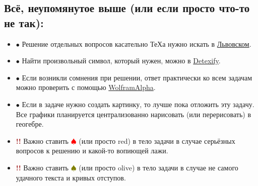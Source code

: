 \documentclass[12pt]{article}
\newenvironment{mylist} %
{ \begin{itemize}
    \setlength{\itemsep}{0pt}
    \setlength{\parskip}{0pt}
    \setlength{\parsep}{0pt}     }
{ \end{itemize}                  }
\begin{document}
\subsection*{\textcolor{Emerald}{\textbf{Всё, неупомянутое выше (или если просто что-то не так):}}}
\begin{mylist}
\item [$\bullet$] Решение отдельных вопросов касательно ТеХа нужно искать в \href{https://www.mccme.ru/free-books/llang/newllang.pdf}{Львовском}.

\item [$\bullet$] Найти произвольный символ, который нужен, можно в \href{http://detexify.kirelabs.org/classify.html}{Detexify}.

\item [$\bullet$] Если возникли сомнения при решении, ответ практически ко всем задачам можно проверить с помощью \href{https://www.wolframalpha.com/}{WolframAlpha}.

\item [$\bullet$] Если в задаче нужно создать картинку, то лучше пока отложить эту задачу. Все графики планируется централизованно нарисовать (или перерисовать) в геогебре.

\item [\textcolor{brown}{\textbf{!!}}] Важно ставить \textcolor{red}{\textbf{$\spadesuit$}}
(или просто red) в тело задачи в случае серьёзных вопросов к решению и какой-то вопиющей лажи.

\item [\textcolor{brown}{\textbf{!!}}] Важно ставить \textcolor{olive}{\textbf{$\spadesuit$}}
(или просто olive) в тело задачи в случае не самого удачного текста и кривых отступов.
\end{mylist}
\end{document}
